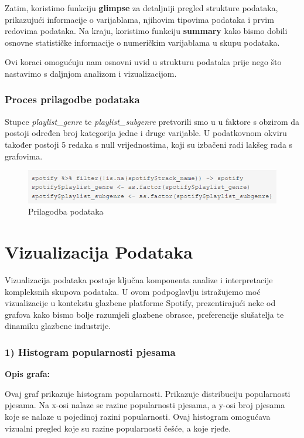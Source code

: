 		Zatim, koristimo funkciju \textbf{glimpse} za detaljniji pregled strukture podataka, prikazujući informacije o varijablama, njihovim tipovima podataka i prvim redovima podataka. Na kraju, koristimo funkciju \textbf{summary} kako bismo dobili osnovne statističke informacije o numeričkim varijablama u skupu podataka.
		
		Ovi koraci omogućuju nam osnovni uvid u strukturu podataka prije nego što nastavimo s daljnjom analizom i vizualizacijom.
		
	
	\subsubsection{Proces prilagodbe podataka}
	Stupce \textit{playlist\_genre} te \textit{playlist\_subgenre} pretvorili smo u u faktore s obzirom da postoji određen broj kategorija jedne i druge varijable. U podatkovnom okviru također postoji 5 redaka s null vrijednostima, koji su izbačeni radi lakšeg rada s grafovima.
	
	\begin{figure}[H]
		\includegraphics[scale=0.9]{slike/prilagodba.png}
		\centering
		\caption{Prilagodba podataka}
		
	\end{figure}
	


\clearpage
\section{Vizualizacija Podataka}
	Vizualizacija podataka postaje ključna komponenta analize i interpretacije kompleksnih skupova podataka. 
	U ovom podpoglavlju istražujemo moć vizualizacije u kontekstu glazbene platforme Spotify, prezentirajući neke od grafova kako bismo bolje razumjeli glazbene obrasce, preferencije slušatelja te dinamiku glazbene industrije.
	
	\subsubsection{1) Histogram popularnosti pjesama}
	
	\textbf{Opis grafa:}
	
	Ovaj graf prikazuje histogram popularnosti. Prikazuje distribuciju popularnosti pjesama. Na x-osi nalaze se razine popularnosti pjesama, a y-osi broj pjesama koje se nalaze u pojedinoj razini popularnosti.
	Ovaj histogram omogućava vizualni pregled koje su razine popularnosti češće, a koje rjeđe. 

